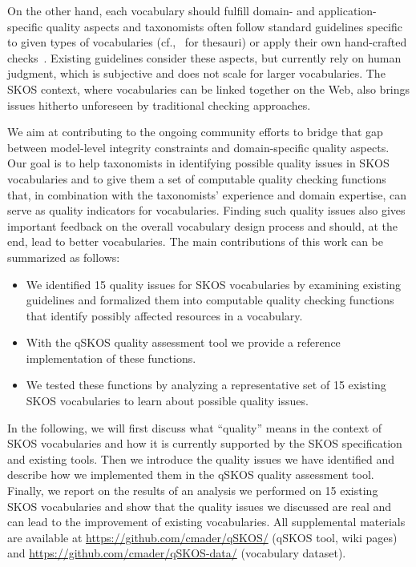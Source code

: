 On the other hand, each vocabulary should fulfill domain- and application-specific quality aspects and taxonomists often follow standard guidelines specific to given types of vocabularies (cf.,~\cite{ISO25964-1:2011,Z39.19:2005} for thesauri) or apply their own hand-crafted checks~\cite{Coronado2009}. Existing guidelines consider these aspects, but currently rely on human judgment, which is subjective and does not scale for larger vocabularies. The SKOS context, where vocabularies can be linked together on the Web, also brings issues hitherto unforeseen by traditional checking approaches.


We aim at contributing to the ongoing community efforts to bridge that gap between model-level integrity constraints and domain-specific quality aspects. Our goal is to help taxonomists in identifying possible quality issues in SKOS vocabularies and to give them a set of computable quality checking functions that, in combination with the taxonomists' experience and domain expertise, can serve as quality indicators for vocabularies. Finding such quality issues also gives important feedback on the overall vocabulary design process and should, at the end, lead to better vocabularies. The main contributions of this work can be summarized as follows:

\begin{itemize}

	\item We identified 15 quality issues for SKOS vocabularies by examining existing guidelines and formalized them into computable quality checking functions that identify possibly affected resources in a vocabulary.
	
	\item With the qSKOS quality assessment tool we provide a reference implementation of these functions.

	\item We tested these functions by analyzing a representative set of 15 existing SKOS vocabularies to learn about possible quality issues.

\end{itemize}

In the following, we will first discuss what ``quality'' means in the context of SKOS vocabularies and how it is currently supported by the SKOS specification and existing tools. Then we introduce the quality issues we have identified and describe how we implemented them in the qSKOS quality assessment tool. Finally, we report on the results of an analysis we performed on 15 existing SKOS vocabularies and show that the quality issues we discussed are real and can lead to the improvement of existing vocabularies. All supplemental materials are available at \url{https://github.com/cmader/qSKOS/} (qSKOS tool, wiki pages) and \url{https://github.com/cmader/qSKOS-data/} (vocabulary dataset).
